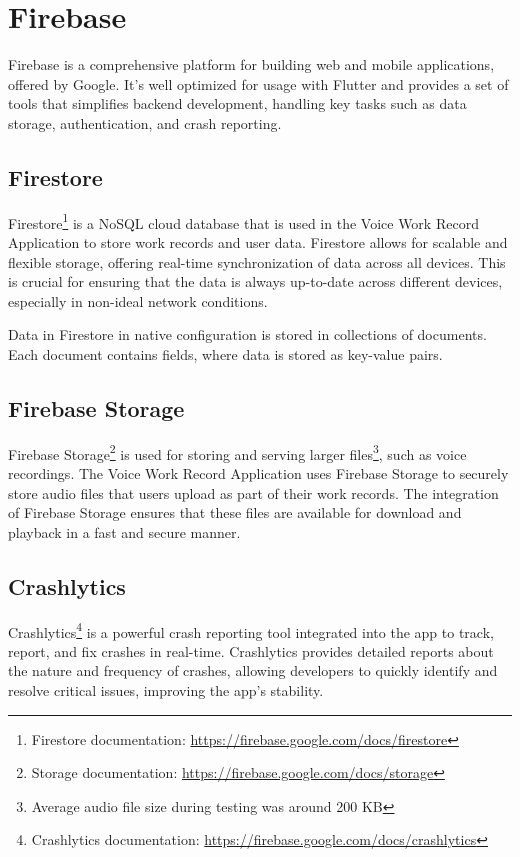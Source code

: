 \documentclass[
  digital,     %
  oneside,     %
  nosansbold,  %
  nocolorbold, %
  lof,         %
  lot,         %
]{fithesis4}
\begin{document}
\section{Firebase}
Firebase is a comprehensive platform for building web and mobile applications, offered by Google. It's well optimized for usage with Flutter and provides a set of tools that simplifies backend development, handling key tasks such as data storage, authentication, and crash reporting.

\subsection{Firestore}
Firestore\footnote{Firestore documentation: \url{https://firebase.google.com/docs/firestore}} is a \acrshort{NoSQL} cloud database that is used in the Voice Work Record Application to store work records and user data. Firestore allows for scalable and flexible storage, offering real-time synchronization of data across all devices. This is crucial for ensuring that the data is always up-to-date across different devices, especially in non-ideal network conditions.

Data in Firestore in native configuration is stored in collections of documents. Each document contains fields, where data is stored as key-value pairs.

\subsection{Firebase Storage}
Firebase Storage\footnote{Storage documentation: \url{https://firebase.google.com/docs/storage}} is used for storing and serving larger files\footnote{Average audio file size during testing was around 200 \acrshort{KB}}, such as voice recordings. The Voice Work Record Application uses Firebase Storage to securely store audio files that users upload as part of their work records. The integration of Firebase Storage ensures that these files are available for download and playback in a fast and secure manner.

\subsection{Crashlytics}
Crashlytics\footnote{Crashlytics documentation: \url{https://firebase.google.com/docs/crashlytics}} is a powerful crash reporting tool integrated into the app to track, report, and fix crashes in real-time. Crashlytics provides detailed reports about the nature and frequency of crashes, allowing developers to quickly identify and resolve critical issues, improving the app's stability.
\end{document}
